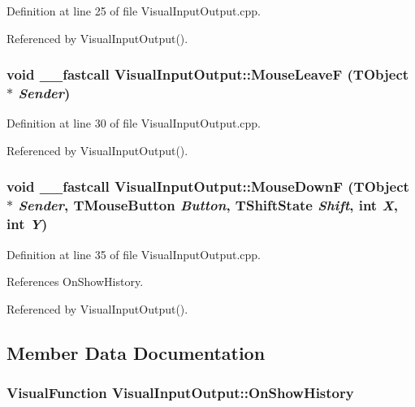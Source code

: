 Definition at line 25 of file VisualInputOutput.cpp.

Referenced by VisualInputOutput().\hypertarget{classVisualInputOutput_d92af8dbf5d8a282a9c3459415f3363d}{
\subsubsection[MouseLeaveF]{\setlength{\rightskip}{0pt plus 5cm}void \_\-\_\-fastcall VisualInputOutput::MouseLeaveF (TObject $\ast$ {\em Sender})}}
\label{classVisualInputOutput_d92af8dbf5d8a282a9c3459415f3363d}




Definition at line 30 of file VisualInputOutput.cpp.

Referenced by VisualInputOutput().\hypertarget{classVisualInputOutput_e6c46a78d42ac09e36cff16974323573}{
\subsubsection[MouseDownF]{\setlength{\rightskip}{0pt plus 5cm}void \_\-\_\-fastcall VisualInputOutput::MouseDownF (TObject $\ast$ {\em Sender}, \/  TMouseButton {\em Button}, \/  TShiftState {\em Shift}, \/  int {\em X}, \/  int {\em Y})}}
\label{classVisualInputOutput_e6c46a78d42ac09e36cff16974323573}




Definition at line 35 of file VisualInputOutput.cpp.

References OnShowHistory.

Referenced by VisualInputOutput().

\subsection{Member Data Documentation}
\hypertarget{classVisualInputOutput_b2f2b186575d7e87de055b36ce867c77}{
\subsubsection[OnShowHistory]{\setlength{\rightskip}{0pt plus 5cm}VisualFunction {\bf VisualInputOutput::OnShowHistory}}}
\label{classVisualInputOutput_b2f2b186575d7e87de055b36ce867c77}


